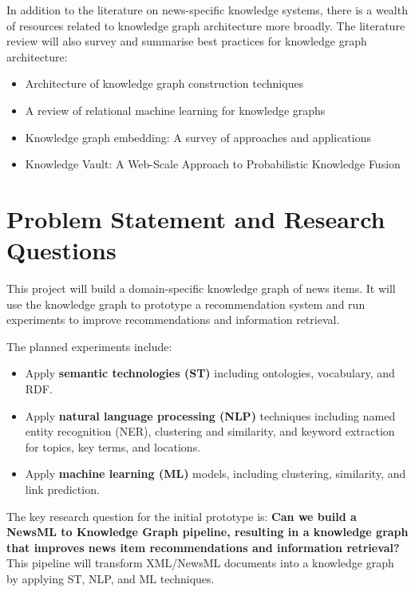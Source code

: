 \documentclass[11pt]{article}
\begin{document}
In addition to the literature on news-specific knowledge systems, there is a wealth of resources related to knowledge graph architecture more broadly. The literature review will also survey and summarise best practices for knowledge graph architecture:

\begin{itemize}
\item Architecture of knowledge graph construction techniques \cite{zhao2018architecture}
\item A review of relational machine learning for knowledge graphs \cite{nickel2015review}
\item Knowledge graph embedding: A survey of approaches and applications \cite{wang2017knowledge}
\item Knowledge Vault: A Web-Scale Approach to Probabilistic Knowledge Fusion \cite{45634}
\end{itemize}

\newpage
\section{Problem Statement and Research Questions}

This project will build a domain-specific knowledge graph of news items. It will use the knowledge graph to prototype a recommendation system and run experiments to improve recommendations and information retrieval.

The planned experiments include:

\begin{itemize}
\item Apply \textbf{semantic technologies (ST)} including ontologies, vocabulary, and RDF.
\item Apply \textbf{natural language processing (NLP)} techniques including named entity recognition (NER), clustering and similarity, and keyword extraction for topics, key terms, and locations.
\item Apply \textbf{machine learning (ML)} models, including clustering, similarity, and link prediction.
\end{itemize}

The key research question for the initial prototype is: \textbf{Can we build a NewsML to Knowledge Graph pipeline, resulting in a knowledge graph that improves news item recommendations and information retrieval?} This pipeline will transform XML/NewsML documents into a knowledge graph by applying ST, NLP, and ML techniques.
\end{document}
